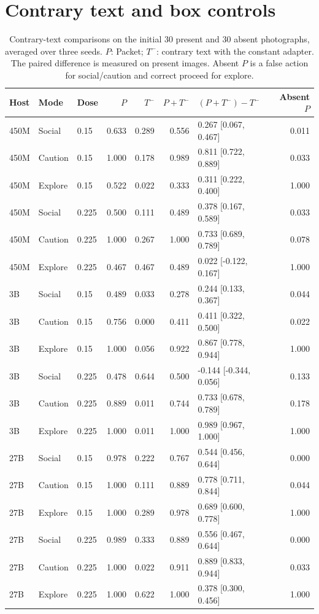 \documentclass[10pt]{article}
\begin{document}
\section{Contrary text and box controls}
\begin{table}[htbp]\centering\footnotesize
\caption{Contrary-text comparisons on the initial 30 present and
30 absent photographs, averaged over three seeds. $P$: Packet;
$T^-$: contrary text with the constant adapter. The paired
difference is measured on present images. Absent $P$ is a
false action for social/caution and correct proceed for explore.}
\label{tab:conflict}
\begin{tabular}{lllrrrlr}\toprule
Host & Mode & Dose & $P$ & $T^-$ & $P+T^-$ &
$(P+T^-)-T^-$ & Absent $P$\\\midrule
450M & Social & 0.15 & 0.633 & 0.289 & 0.556 & 0.267 [0.067, 0.467] & 0.011 \\
450M & Caution & 0.15 & 1.000 & 0.178 & 0.989 & 0.811 [0.722, 0.889] & 0.033 \\
450M & Explore & 0.15 & 0.522 & 0.022 & 0.333 & 0.311 [0.222, 0.400] & 1.000 \\
450M & Social & 0.225 & 0.500 & 0.111 & 0.489 & 0.378 [0.167, 0.589] & 0.033 \\
450M & Caution & 0.225 & 1.000 & 0.267 & 1.000 & 0.733 [0.689, 0.789] & 0.078 \\
450M & Explore & 0.225 & 0.467 & 0.467 & 0.489 & 0.022 [-0.122, 0.167] & 1.000 \\
3B & Social & 0.15 & 0.489 & 0.033 & 0.278 & 0.244 [0.133, 0.367] & 0.044 \\
3B & Caution & 0.15 & 0.756 & 0.000 & 0.411 & 0.411 [0.322, 0.500] & 0.022 \\
3B & Explore & 0.15 & 1.000 & 0.056 & 0.922 & 0.867 [0.778, 0.944] & 1.000 \\
3B & Social & 0.225 & 0.478 & 0.644 & 0.500 & -0.144 [-0.344, 0.056] & 0.133 \\
3B & Caution & 0.225 & 0.889 & 0.011 & 0.744 & 0.733 [0.678, 0.789] & 0.178 \\
3B & Explore & 0.225 & 1.000 & 0.011 & 1.000 & 0.989 [0.967, 1.000] & 1.000 \\
27B & Social & 0.15 & 0.978 & 0.222 & 0.767 & 0.544 [0.456, 0.644] & 0.000 \\
27B & Caution & 0.15 & 1.000 & 0.111 & 0.889 & 0.778 [0.711, 0.844] & 0.044 \\
27B & Explore & 0.15 & 1.000 & 0.289 & 0.978 & 0.689 [0.600, 0.778] & 1.000 \\
27B & Social & 0.225 & 0.989 & 0.333 & 0.889 & 0.556 [0.467, 0.644] & 0.000 \\
27B & Caution & 0.225 & 1.000 & 0.022 & 0.911 & 0.889 [0.833, 0.944] & 0.033 \\
27B & Explore & 0.225 & 1.000 & 0.622 & 1.000 & 0.378 [0.300, 0.456] & 1.000 \\

\bottomrule\end{tabular}
\end{table}
\end{document}
